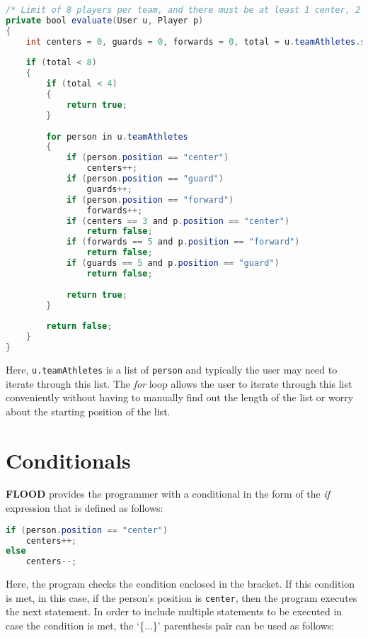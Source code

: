 \documentclass[12pt]{report}
\begin{document}
\begin{lstlisting}[language=Java,label=some-code,caption=For loop]
/* Limit of 8 players per team, and there must be at least 1 center, 2 guards and 2 forwards per team. */
private bool evaluate(User u, Player p)
{
	int centers = 0, guards = 0, forwards = 0, total = u.teamAthletes.size();
	
	if (total < 8)
	{
		if (total < 4)
		{
			return true;
		}
		
		for person in u.teamAthletes
		{
			if (person.position == "center")
				centers++;
			if (person.position == "guard")
				guards++;
			if (person.position == "forward")
				forwards++;
			if (centers == 3 and p.position == "center")
				return false;
			if (forwards == 5 and p.position == "forward")
				return false;
			if (guards == 5 and p.position == "guard")
				return false;
		
			return true;
		}
		
		return false;
	}
}
\end{lstlisting}

\begin{doublespace}
Here, \texttt{u.teamAthletes} is a list of \texttt{person} and typically the user may need to iterate through this list. The \textit{for} loop allows the user to iterate through this list conveniently without having to manually find out the length of the list or worry about the starting position of the list.
\end{doublespace}

\section{Conditionals}

\begin{doublespace}
\textbf{FLOOD} provides the programmer with a conditional in the form of the \textit{if} expression that is defined as follows:
\end{doublespace}

\begin{lstlisting}[language=Java,label=some-code,caption=if conditional]
if (person.position == "center")
	centers++;
else
	centers--;
\end{lstlisting}

\begin{doublespace}
Here, the program checks the condition enclosed in the bracket. If this condition is met, in this case, if the person's position is \texttt{center}, then the program executes the next statement. In order to include multiple statements to be executed in case the condition is met, the `\{$\ldots$\}'
parenthesis pair can be used as follows:
\end{doublespace}
\end{document}
